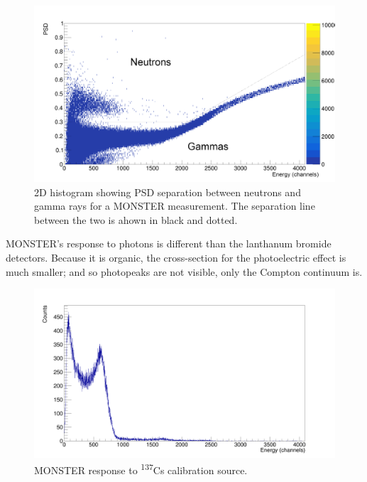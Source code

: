 \documentclass[a4paper,12pt]{report}
\begin{document}
\begin{figure}[H]
	\centering
	\includegraphics[width=\textwidth]{example_psd.png}
	\caption{2D histogram showing PSD separation between neutrons and gamma rays for a MONSTER measurement.
	The separation line between the two is ahown in black and dotted.}
	\label{example_psd}
\end{figure}

MONSTER's response to photons is different than the lanthanum bromide detectors.
Because it is organic, the cross-section for the photoelectric effect is much smaller; and so photopeaks are not visible, only the Compton continuum is.

\begin{figure}[H]
	\centering
	\includegraphics[width=\textwidth]{monster_cs_calibration.png}
	\caption{MONSTER response to \textsuperscript{137}Cs calibration source.}
	\label{monster_cs_calibration}
\end{figure}
\end{document}
